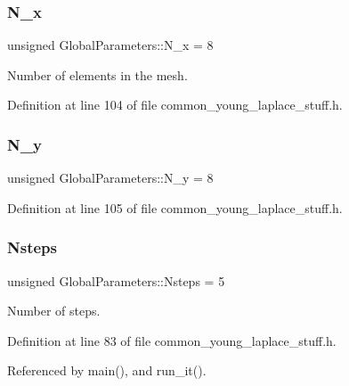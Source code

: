 \mbox{\label{namespaceGlobalParameters_ab020cb50fa321b26e8d2127d2cff23b9}} 
\subsubsection{\texorpdfstring{N\+\_\+x}{N\_x}}
{\footnotesize\ttfamily unsigned Global\+Parameters\+::\+N\+\_\+x = 8}



Number of elements in the mesh. 



Definition at line 104 of file common\+\_\+young\+\_\+laplace\+\_\+stuff.\+h.

\mbox{\label{namespaceGlobalParameters_a711d6f05552ddaac30bd245ae8bdf878}} 
\subsubsection{\texorpdfstring{N\+\_\+y}{N\_y}}
{\footnotesize\ttfamily unsigned Global\+Parameters\+::\+N\+\_\+y = 8}



Definition at line 105 of file common\+\_\+young\+\_\+laplace\+\_\+stuff.\+h.

\mbox{\label{namespaceGlobalParameters_aa6c94936d7c81286bb747e14a90d7ba0}} 
\subsubsection{\texorpdfstring{Nsteps}{Nsteps}}
{\footnotesize\ttfamily unsigned Global\+Parameters\+::\+Nsteps = 5}



Number of steps. 



Definition at line 83 of file common\+\_\+young\+\_\+laplace\+\_\+stuff.\+h.



Referenced by main(), and run\+\_\+it().

